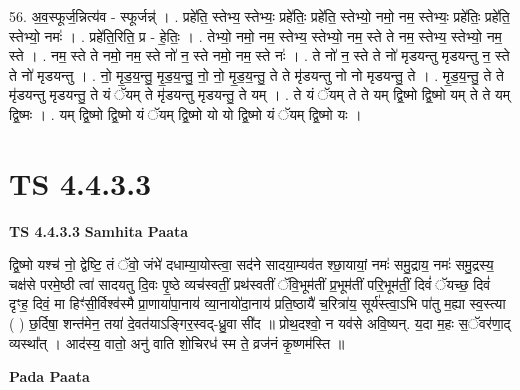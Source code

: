 \documentclass[17pt]{extarticle}
\begin{document}
56. अ॒व॒स्फूर्ज॒न्नित्य॑व - स्फूर्जन्न्॑ । . प्रहे॑ति॒ स्तेभ्य॒ स्तेभ्यः॒ प्रहे॑तिः॒ प्रहे॑ति॒ स्तेभ्यो॒ नमो॒ नम॒ स्तेभ्यः॒ प्रहे॑तिः॒ प्रहे॑ति॒ स्तेभ्यो॒ नमः॑ । . प्रहे॑ति॒रिति॒ प्र - हे॒तिः॒ । . तेभ्यो॒ नमो॒ नम॒ स्तेभ्य॒ स्तेभ्यो॒ नम॒ स्ते ते नम॒ स्तेभ्य॒ स्तेभ्यो॒ नम॒ स्ते । . नम॒ स्ते ते नमो॒ नम॒ स्ते नो॑ न॒ स्ते नमो॒ नम॒ स्ते नः॑ । . ते नो॑ न॒ स्ते ते नो॑ मृडयन्तु मृडयन्तु न॒ स्ते ते नो॑ मृडयन्तु । . नो॒ मृ॒ड॒य॒न्तु॒ मृ॒ड॒य॒न्तु॒ नो॒ नो॒ मृ॒ड॒य॒न्तु॒ ते ते मृ॑डयन्तु नो नो मृडयन्तु॒ ते । . मृ॒ड॒य॒न्तु॒ ते ते मृ॑डयन्तु मृडयन्तु॒ ते यं ॅयम् ते मृ॑डयन्तु मृडयन्तु॒ ते यम् । . ते यं ॅयम् ते ते यम् द्वि॒ष्मो द्वि॒ष्मो यम् ते ते यम् द्वि॒ष्मः । . यम् द्वि॒ष्मो द्वि॒ष्मो यं ॅयम् द्वि॒ष्मो यो यो द्वि॒ष्मो यं ॅयम् द्वि॒ष्मो यः । \newline
\pagebreak
{}

\section{ TS 4.4.3.3 }

\textbf{TS 4.4.3.3 } \newline
\textbf{Samhita Paata} \newline

द्वि॒ष्मो यश्च॑ नो॒ द्वेष्टि॒ तं ॅवो॒ जंभे॑ दधाम्या॒योस्त्वा॒ सद॑ने सादया॒म्यव॑त श्छा॒यायां॒ नमः॑ समु॒द्राय॒ नमः॑ समु॒द्रस्य॒ चक्ष॑से परमे॒ष्ठी त्वा॑ सादयतु दि॒वः पृ॒ष्ठे व्यच॑स्वतीं॒ प्रथ॑स्वतीं ॅवि॒भूम॑तीं प्र॒भूम॑तीं परि॒भूम॑तीं॒ दिवं॑ ॅयच्छ॒ दिवं॑ दृꣳह॒ दिवं॒ मा हिꣳ॑सी॒र्विश्व॑स्मै प्रा॒णाया॑पा॒नाय॑ व्या॒नायो॑दा॒नाय॑ प्रति॒ष्ठायै॑ च॒रित्रा॑य॒ सूर्य॑स्त्वा॒ऽभि पा॑तु म॒ह्या स्व॒स्त्या ( ) छ॒र्दिषा॒ शन्त॑मेन॒ तया॑ दे॒वत॑याऽङ्गिर॒स्वद्-ध्रु॒वा सी॑द ॥ प्रोथ॒दश्वो॒ न यव॑से अवि॒ष्यन्. य॒दा म॒हः स॒ॅवर॑णा॒द् व्यस्था᳚त् । आद॑स्य॒ वातो॒ अनु॑ वाति शो॒चिरध॑ स्म ते॒ व्रज॑नं कृ॒ष्णम॑स्ति ॥ \newline

\textbf{Pada Paata} \newline
\end{document}
